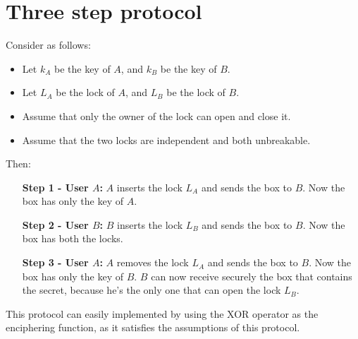 \section{Three step protocol}
\begin{definition}
    Consider as follows:
    \begin{itemize}
        \item Let $k_{A}$ be the key of $A$, and $k_{B}$ be the key of $B$.
        \item Let $L_{A}$ be the lock of $A$, and $L_{B}$ be the lock of $B$.
        \item Assume that only the owner of the lock can open and close it.
        \item Assume that the two locks are independent and both unbreakable.
    \end{itemize}
    Then:
    \begin{itemize}
        \item[\textbf{Step 1 - User $A$:}] $A$ inserts the lock $L_{A}$ and sends the box to $B$. Now the box has only the key of $A$.
        \item[\textbf{Step 2 - User $B$:}] $B$ inserts the lock $L_{B}$ and sends the box to $B$. Now the box has both the locks.
        \item[\textbf{Step 3 - User $A$:}] $A$ removes the lock $L_{A}$ and sends the box to $B$. Now the box has only the key of $B$. $B$ can now receive securely the box that contains the secret, because he's the only one that can open the lock $L_{B}$.
    \end{itemize}
\end{definition}
This protocol can easily implemented by using the XOR operator as the enciphering function, as it satisfies the assumptions of this protocol.
